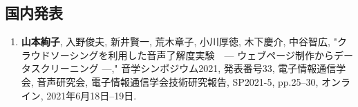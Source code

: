 \documentclass[11pt]{jreport}
\begin{document}
\subsection*{国内発表}
 \begin{enumerate}
    \item \textbf{山本絢子}, 入野俊夫, 新井賢一, 荒木章子, 小川厚徳, 木下慶介, 中谷智広, "クラウドソーシングを利用した音声了解度実験　--- ウェブページ制作からデータスクリーニング ---," 音学シンポジウム2021, 発表番号33, 電子情報通信学会, 音声研究会, 電子情報通信学会技術研究報告, SP2021-5, pp.25--30, オンライン, 2021年6月18日--19日.
    







\end{enumerate}
\end{document}
